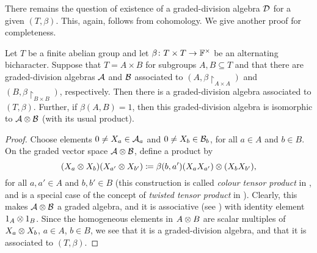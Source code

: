 There remains the question of existence of a graded-division algebra $\mathcal{D}$ for a given $(T,\beta)$. 
This, again, follows from cohomology. 
We give another proof for completeness. 

\begin{lemma}\label{lemma:colour-tensor-product}
    Let $T$ be a finite abelian group and let $\beta\colon T\times T \to \mathbb{F}^\times$ be an alternating bicharacter. 
    Suppose that $T = A\times B$ for subgroups $A, B \subseteq T$ and that there are graded-division algebras $\mathcal A$ and $\mathcal B$ associated to $(A, \beta\restriction_{A\times A})$ and $(B, \beta\restriction_{B\times B})$, respectively. 
    Then there is a graded-division algebra associated to $(T, \beta)$. 
    Further, if $\beta(A,B) = 1$, then this graded-division algebra is isomorphic to $\mathcal A \otimes \mathcal B$ (with its usual product).
\end{lemma}

\begin{proof}
    Choose elements $0 \neq X_a \in \mathcal A_a$ and $0 \neq X_b \in \mathcal B_b$, for all $a\in A$ and $b\in B$. 
    On the graded vector space $\mathcal A \otimes \mathcal B$, define a product by \[(X_a \otimes X_b) (X_{a'} \otimes X_{b'}) \coloneqq \beta(b, a') (X_{a} X_{a'}) \otimes (X_{b}X_{b'}),\] for all $a,a' \in A$ and $b, b' \in B$ (this construction is called \emph{colour tensor product} in \cite[page 88]{MR1192546}, and is a special case of the concept of \emph{twisted tensor product} in \cite{twisted-tensor}). 
    Clearly, this makes $\mathcal A \otimes \mathcal B$ a graded algebra, and it is associative (see \cite{MR1192546}) %
    with identity element $1_A \otimes 1_B$. Since the homogeneous elements in $A\otimes B$ are scalar multiples of $X_a \otimes X_b$, $a\in A$, $b\in B$, we see that it is a graded-division algebra, and that it is associated to $(T, \beta)$. 
\end{proof}

